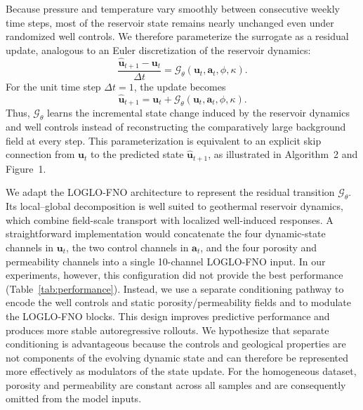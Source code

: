 \documentclass[pdflatex,sn-mathphys-ay]{sn-jnl}
\newcommand{\svec}{\mathbf{u}}            %
\newcommand{\action}{\mathbf{a}}           %
\newcommand{\model}{\mathcal{G}_\theta}    %
\begin{document}
Because pressure and temperature vary smoothly between consecutive weekly time
steps, most of the reservoir state remains nearly unchanged even under
randomized well controls. We therefore parameterize the surrogate as a residual
update, analogous to an Euler discretization of the reservoir dynamics:
\begin{equation}
  \frac{\hat{\svec}_{t+1}-\svec_t}{\Delta t}
  =
  \model(\svec_t,\action_t,\phi,\kappa).
  \label{eq:euler}
\end{equation}
For the unit time step \(\Delta t=1\), the update becomes
\begin{equation}
  \hat{\svec}_{t+1}
  =
  \svec_t+\model(\svec_t,\action_t,\phi,\kappa).
  \label{eq:update}
\end{equation}
Thus, \(\model\) learns the incremental state change induced by the reservoir
dynamics and well controls instead of reconstructing the comparatively large
background field at every step. This parameterization is equivalent to an
explicit skip connection from \(\svec_t\) to the predicted state
\(\hat{\svec}_{t+1}\), as illustrated in Algorithm~2 and Figure~1.

We adapt the LOGLO-FNO architecture to represent the residual transition
\(\model\). Its local--global decomposition is well suited to geothermal
reservoir dynamics, which combine field-scale transport with localized
well-induced responses. A straightforward implementation would concatenate the
four dynamic-state channels in \(\svec_t\), the two control channels in
\(\action_t\), and the four porosity and permeability channels into a single
10-channel LOGLO-FNO input. In our experiments, however, this configuration did
not provide the best performance (Table~\ref{tab:performance}). Instead, we use
a separate conditioning pathway to encode the well controls and static
porosity/permeability fields and to modulate the LOGLO-FNO blocks. This design
improves predictive performance and produces more stable autoregressive
rollouts. We hypothesize that separate conditioning is advantageous because the
controls and geological properties are not components of the evolving dynamic
state and can therefore be represented more effectively as modulators of the
state update. For the homogeneous dataset, porosity and permeability are
constant across all samples and are consequently omitted from the model inputs.
\end{document}
